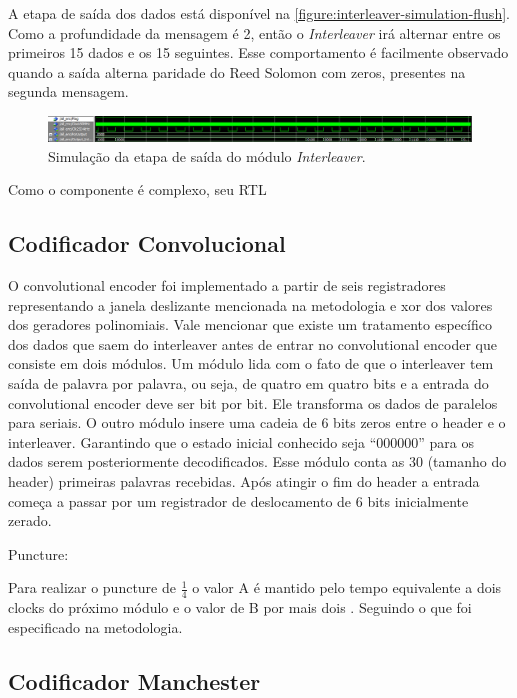 	A etapa de saída dos dados está disponível na \autoref{figure:interleaver-simulation-flush}. Como a profundidade da mensagem é 2, então o \textit{Interleaver} irá alternar entre os primeiros 15 dados e os 15 seguintes. Esse comportamento é facilmente observado quando a saída alterna paridade do Reed Solomon com zeros, presentes na segunda mensagem.
	
	\begin{figure}[h]
		\caption{\label{figure:interleaver-simulation-flush}Simulação da etapa de saída do módulo \textit{Interleaver}.}
		\centering
		\includegraphics[width=1\textwidth]{interleaver/simulation-flush.png}
	\end{figure}

	Como o componente é complexo, seu RTL
	
	\subsection{Codificador Convolucional}	
	
	
	
	O convolutional encoder foi implementado a partir de seis registradores representando a janela deslizante mencionada na metodologia e xor dos valores dos geradores polinomiais.
	Vale mencionar que existe um tratamento específico dos dados que saem do interleaver antes de entrar no convolutional encoder que consiste em dois módulos. Um módulo lida com o fato de que o interleaver tem saída de palavra por palavra, ou seja, de quatro em quatro bits e a entrada do convolutional encoder deve ser bit por bit. Ele transforma os dados de paralelos para seriais.
	O outro módulo insere uma cadeia de 6 bits zeros entre o header e o interleaver. Garantindo que o estado inicial conhecido seja “000000” para os dados serem posteriormente decodificados. Esse módulo conta as 30 (tamanho do header) primeiras palavras recebidas. Após atingir o fim do header a entrada começa a passar por um registrador de deslocamento de 6 bits inicialmente zerado.
	
	Puncture:
	
	Para realizar o puncture de $\frac{1}{4}$ o valor A é mantido pelo tempo equivalente a dois clocks do próximo módulo e o valor de B por mais dois \textit{}. Seguindo o que foi especificado na metodologia.
	
	\subsection{Codificador Manchester}
	
